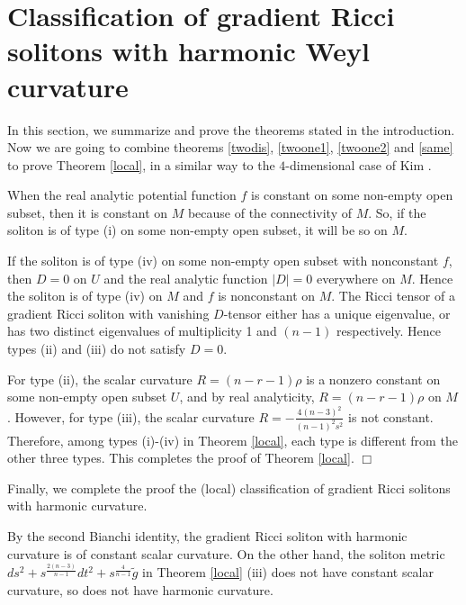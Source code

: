 \documentclass{amsart}
\theoremstyle{definition}
\theoremstyle{remark}
\numberwithin{equation}{section}
\begin{document}
	\section{Classification of gradient Ricci solitons with harmonic Weyl curvature}
	In this section, we summarize and prove the theorems stated in the introduction.
Now we are going to combine theorems \ref{twodis}, 
\ref{twoone1}, \ref{twoone2} and \ref{same} to prove Theorem \ref{local}, 
in a similar way to the $4$-dimensional case of Kim \cite{Kim}.

\medskip
{} 
When the real analytic potential function $f$ is constant on some non-empty open subset, 
then it is constant on $M$ because of the connectivity of $M$.
So, if the soliton is of type {\rm (i)} on some non-empty open subset, it will be so on $M$.

If the soliton is of type {\rm (iv)} on some non-empty open subset with nonconstant $f$, 
then $D=0$ on $U$ and the real analytic function $\left| D \right| =0$ everywhere on $M$. 
Hence the soliton is of type {\rm (iv)} on $M$ and $f$ is nonconstant on $M$. 
The Ricci tensor of a gradient Ricci soliton with vanishing $D$-tensor 
either has a unique eigenvalue, or has two distinct eigenvalues of 
multiplicity 1 and $(n-1)$ respectively. 
Hence types {\rm (ii)} and {\rm (iii)} do not satisfy $D=0$.

For type {\rm (ii)}, the scalar curvature $R=(n-r-1)\rho$ is a nonzero constant on some non-empty open subset $U$,
and by real analyticity, $R=(n-r-1)\rho$ on $M$.
However, for type {\rm (iii)}, the scalar curvature 
$R= -\frac{4(n-3)^2}{(n-1)^2s^2}$ is not constant.
Therefore, among types {\rm (i)}-{\rm (iv)} in Theorem \ref{local}, each type is different from the other three types.
This completes the proof of Theorem \ref{local}.
\hfill $\Box$
\medskip

Finally, we complete the proof the (local) classification of gradient Ricci solitons 
with harmonic curvature.

\vspace{0.3cm}

By the second Bianchi identity, the gradient Ricci soliton with harmonic curvature is of
constant scalar curvature.
On the other hand, the soliton metric $ds^2 + s^{\frac{2(n-3)}{n-1}} dt^2+ s^{\frac{4}{n-1}} \tilde{g}$ 
in Theorem \ref{local} {\rm (iii)} does not have constant scalar curvature,
so does not have harmonic curvature.
\end{document}
